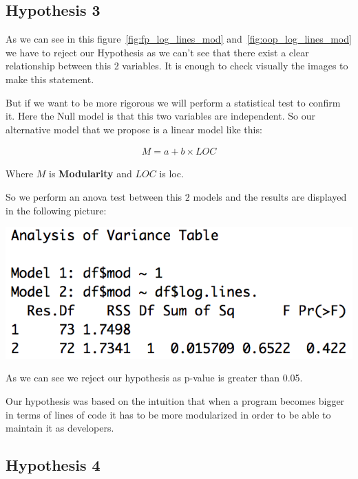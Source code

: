 \documentclass[12pt, a4paper]{article}
\begin{document}
\subsection{Hypothesis 3}
As we can see in this figure~\ref{fig:fp_log_lines_mod} and~\ref{fig:oop_log_lines_mod} we have to reject our Hypothesis as we can't see that there exist a clear relationship between this 2 variables. It is enough to check visually the images to make this statement.

But if we want to be more rigorous we will perform a statistical test to confirm it. Here the Null model is that this two variables are independent. So our alternative model that we propose is a linear model like this:

\begin{subequations}
    \begin{align}
        M = a + b \times LOC
    \end{align}
\end{subequations}

Where $M$ is \textbf{Modularity} and $LOC$ is \acrlong{loc}.

So we perform an \acrfull{anova} test between this $2$ models and the results are displayed in the following picture:

\begin{minipage}[t]{\linewidth}
    \includegraphics[width=\textwidth]{images/anova.png}
    \captionsetup{type=figure}
    \label{fig:anova}
  \end{minipage}

As we can see we reject our hypothesis as p-value is greater than 0.05.

Our hypothesis was based on the intuition that when a program becomes bigger in terms of lines of code it has to be more modularized in order to be able to maintain it as developers.

\subsection{Hypothesis 4}
\end{document}
